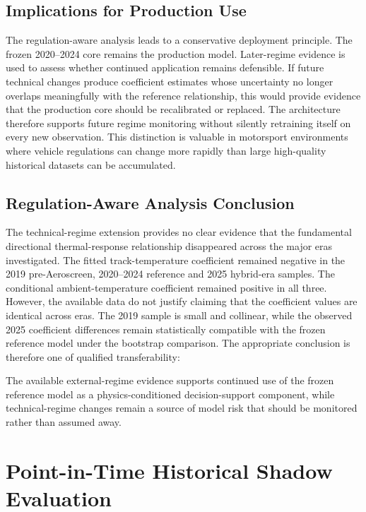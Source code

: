 \subsection{Implications for Production Use}
The regulation-aware analysis leads to a conservative deployment principle. The frozen 2020--2024 core remains the production model. Later-regime evidence is used to assess whether continued application remains defensible. If future technical changes produce coefficient estimates whose uncertainty no longer overlaps meaningfully with the reference relationship, this would provide evidence that the production core should be recalibrated or replaced. The architecture therefore supports future regime monitoring without silently retraining itself on every new observation. This distinction is valuable in motorsport environments where vehicle regulations can change more rapidly than large high-quality historical datasets can be accumulated.

\subsection{Regulation-Aware Analysis Conclusion}
The technical-regime extension provides no clear evidence that the fundamental directional thermal-response relationship disappeared across the major eras investigated. The fitted track-temperature coefficient remained negative in the 2019 pre-Aeroscreen, 2020--2024 reference and 2025 hybrid-era samples. The conditional ambient-temperature coefficient remained positive in all three. However, the available data do not justify claiming that the coefficient values are identical across eras. The 2019 sample is small and collinear, while the observed 2025 coefficient differences remain statistically compatible with the frozen reference model under the bootstrap comparison. The appropriate conclusion is therefore one of qualified transferability:

The available external-regime evidence supports continued use of the frozen reference model as a physics-conditioned decision-support component, while technical-regime changes remain a source of model risk that should be monitored rather than assumed away.

\section{Point-in-Time Historical Shadow Evaluation}
\label{sec:pit}

